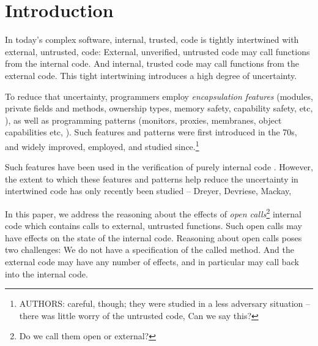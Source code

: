 \section{Introduction}
\label{s:intro}

\newcommand{\Tamed}{Tamed\xspace}
\newcommand{\tamed}{tamed\xspace}
\newcommand{\tame}{tame\xspace}
\newcommand{\tames}{tames\xspace}
\newcommand{\Taming}{Taming\xspace}
\newcommand{\taming}{taming\xspace}

 In today's complex software, internal, trusted, code  is tightly intertwined  with external, untrusted, code:
External, unverified, untrusted code may call functions from the internal code.
And internal, trusted code may call functions from the  external  code.
This tight intertwining   introduces a high degree of uncertainty.

To  reduce  that uncertainty, programmers employ  
\emph{encapsulation  features}
 (\eg   modules, private fields and methods, ownership types, memory safety, capability safety,  etc, \cite{private}),
as well as programming patterns (\eg monitors, proxies, membranes, object capabilities etc, \cite{mebranes}).
Such  features and patterns were first introduced in the 70s, and widely improved, employed, and studied since.\footnote{AUTHORS: careful, though; they were studied in a less adversary situation -- there was little worry of the untrusted code, Can we say this?}

Such features have been  used in the verification of purely internal code  \cite{Muller, Leino}.
However, the extent to which these features and patterns help reduce the uncertainty in intertwined code
has only recently  been studied \cite{xxx} -- Dreyer, Devriese, Mackay,  

%
In this paper, we address the reasoning about the effects of  \emph{open calls}\footnote{Do we call them open or external?} 
\ie  internal code which contains calls to external, untrusted functions.
Such open calls may have effects on the state of the internal code. 
Reasoning about  open calls poses two challenges:  
We do not have a specification of the called method. 
And the external code may have any number of effects, and in particular may call back into the internal code.

\vspace{.1cm}

